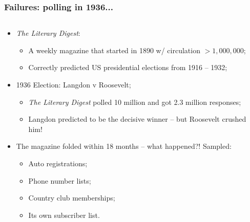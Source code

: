 \documentclass[aspectratio=169]{beamer}
\theoremstyle{principle}
\begin{document}
\begin{frame}
\frametitle{Failures: polling in 1936...}

\begin{columns}
\begin{column}{0.5\textwidth}

\begin{itemize}
\item \textit{The Literary Digest}:
\begin{itemize}
\item A weekly magazine that started in 1890 w/ circulation $> 1,000,000$;
\item Correctly predicted US presidential elections from 1916 -- 1932;
\end{itemize}

\item 1936 Election: Langdon v Roosevelt;
\begin{itemize}
\item \textit{The Literary Digest} polled 10 million and got 2.3 million responses;
\item Langdon predicted to be the decisive winner -- but Roosevelt crushed him!
\end{itemize}

\item The magazine folded within 18 months -- what happened?!  Sampled:
\begin{itemize}
\item Auto registrations;
\item Phone number lists;
\item Country club memberships;
\item Its own subscriber list.
\end{itemize}
\end{itemize}


\end{column}
\end{columns}
\end{frame}
\end{document}
